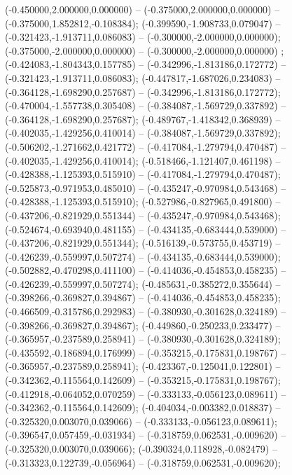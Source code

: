  (-0.450000,2.000000,0.000000) -- (-0.375000,2.000000,0.000000) -- (-0.375000,1.852812,-0.108384);
 (-0.399590,-1.908733,0.079047) -- (-0.321423,-1.913711,0.086083) -- (-0.300000,-2.000000,0.000000);
 (-0.375000,-2.000000,0.000000) -- (-0.300000,-2.000000,0.000000) ;
 (-0.424083,-1.804343,0.157785) -- (-0.342996,-1.813186,0.172772) -- (-0.321423,-1.913711,0.086083);
 (-0.447817,-1.687026,0.234083) -- (-0.364128,-1.698290,0.257687) -- (-0.342996,-1.813186,0.172772);
 (-0.470004,-1.557738,0.305408) -- (-0.384087,-1.569729,0.337892) -- (-0.364128,-1.698290,0.257687);
 (-0.489767,-1.418342,0.368939) -- (-0.402035,-1.429256,0.410014) -- (-0.384087,-1.569729,0.337892);
 (-0.506202,-1.271662,0.421772) -- (-0.417084,-1.279794,0.470487) -- (-0.402035,-1.429256,0.410014);
 (-0.518466,-1.121407,0.461198) -- (-0.428388,-1.125393,0.515910) -- (-0.417084,-1.279794,0.470487);
 (-0.525873,-0.971953,0.485010) -- (-0.435247,-0.970984,0.543468) -- (-0.428388,-1.125393,0.515910);
 (-0.527986,-0.827965,0.491800) -- (-0.437206,-0.821929,0.551344) -- (-0.435247,-0.970984,0.543468);
 (-0.524674,-0.693940,0.481155) -- (-0.434135,-0.683444,0.539000) -- (-0.437206,-0.821929,0.551344);
 (-0.516139,-0.573755,0.453719) -- (-0.426239,-0.559997,0.507274) -- (-0.434135,-0.683444,0.539000);
 (-0.502882,-0.470298,0.411100) -- (-0.414036,-0.454853,0.458235) -- (-0.426239,-0.559997,0.507274);
 (-0.485631,-0.385272,0.355644) -- (-0.398266,-0.369827,0.394867) -- (-0.414036,-0.454853,0.458235);
 (-0.466509,-0.315786,0.292983) -- (-0.380930,-0.301628,0.324189) -- (-0.398266,-0.369827,0.394867);
 (-0.449860,-0.250233,0.233477) -- (-0.365957,-0.237589,0.258941) -- (-0.380930,-0.301628,0.324189);
 (-0.435592,-0.186894,0.176999) -- (-0.353215,-0.175831,0.198767) -- (-0.365957,-0.237589,0.258941);
 (-0.423367,-0.125041,0.122801) -- (-0.342362,-0.115564,0.142609) -- (-0.353215,-0.175831,0.198767);
 (-0.412918,-0.064052,0.070259) -- (-0.333133,-0.056123,0.089611) -- (-0.342362,-0.115564,0.142609);
 (-0.404034,-0.003382,0.018837) -- (-0.325320,0.003070,0.039066) -- (-0.333133,-0.056123,0.089611);
 (-0.396547,0.057459,-0.031934) -- (-0.318759,0.062531,-0.009620) -- (-0.325320,0.003070,0.039066);
 (-0.390324,0.118928,-0.082479) -- (-0.313323,0.122739,-0.056964) -- (-0.318759,0.062531,-0.009620);

